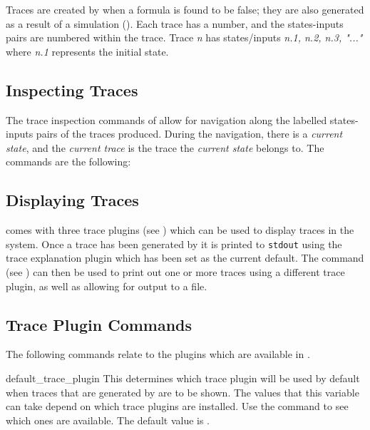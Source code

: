 Traces are created by \nusmv when a formula is found to be false; they
are also generated as a result of a simulation ().  Each trace has a number, and the states-inputs pairs are
numbered within the trace.  Trace {\it n} has states/inputs {\it n.1,
n.2, n.3, "..."} where \textit{n.1} represents the initial state.\\

\subsection{Inspecting Traces}
\label{Inspecting Traces}
%
The trace inspection commands of \nusmv allow for navigation along the
labelled states-inputs pairs of the traces produced. During the
navigation, there is a {\it current state}, and the {\it current
trace} is the trace the {\it current state} belongs to. The commands
are the following:





\subsection{Displaying Traces}
\label{Displaying Traces}
%
\nusmv comes with three trace plugins (see ) which
can be used to display traces in the system. Once a trace has been
generated by \nusmv it is printed to \texttt{stdout} using the trace
explanation plugin which has been set as the current default. The
command  (see ) can
then be used to print out one or more traces using a different trace
plugin, as well as allowing for output to a file.


\subsection{Trace Plugin Commands}
\label{Trace Plugin Commands}
The following commands relate to the plugins which are available
in \nusmv.



\begin{nusmvVar} {default\_trace\_plugin}{}{}
This determines which trace plugin will be used by default when traces
that are generated by \nusmv are to be shown. The values that this
variable can take depend on which trace plugins are installed. Use the
command
 to see which ones are available. The default
value is .
\end{nusmvVar}

